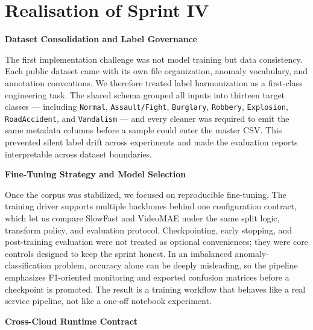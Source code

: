 \documentclass[12pt,a4paper,oneside]{report}
\begin{document}
\section{Realisation of Sprint IV}
\label{sec:s4_realisation}

\textbf{Dataset Consolidation and Label Governance}

\hspace{0.8cm}The first implementation challenge was not model training but data consistency. Each public dataset came with its own file organization, anomaly vocabulary, and annotation conventions. We therefore treated label harmonization as a first-class engineering task. The shared schema grouped all inputs into thirteen target classes --- including \texttt{Normal}, \texttt{Assault/Fight}, \texttt{Burglary}, \texttt{Robbery}, \texttt{Explosion}, \texttt{RoadAccident}, and \texttt{Vandalism} --- and every cleaner was required to emit the same metadata columns before a sample could enter the master CSV. This prevented silent label drift across experiments and made the evaluation reports interpretable across dataset boundaries.

\textbf{Fine-Tuning Strategy and Model Selection}

\hspace{0.8cm}Once the corpus was stabilized, we focused on reproducible fine-tuning. The training driver supports multiple backbones behind one configuration contract, which let us compare SlowFast and VideoMAE under the same split logic, transform policy, and evaluation protocol. Checkpointing, early stopping, and post-training evaluation were not treated as optional conveniences; they were core controls designed to keep the sprint honest. In an imbalanced anomaly-classification problem, accuracy alone can be deeply misleading, so the pipeline emphasizes F1-oriented monitoring and exported confusion matrices before a checkpoint is promoted. The result is a training workflow that behaves like a real service pipeline, not like a one-off notebook experiment.

\textbf{Cross-Cloud Runtime Contract}
\end{document}
